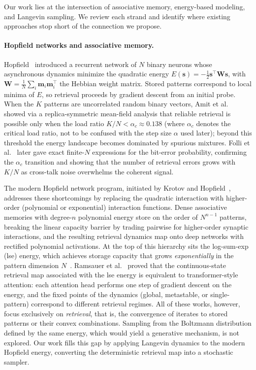 
Our work lies at the intersection of associative memory, energy-based modeling, and Langevin sampling. We review each strand and identify where existing approaches stop short of the connection we propose.

\paragraph{Hopfield networks and associative memory.}
Hopfield~\cite{hopfieldNeuralNetworksPhysical1982} introduced a recurrent network of $N$ binary neurons whose asynchronous dynamics minimize the quadratic energy $E(\mathbf{s})=-\frac{1}{2}\mathbf{s}^{\top}\mathbf{W}\mathbf{s}$, with $\mathbf{W}=\frac{1}{N}\sum_{i}\mathbf{m}_i\mathbf{m}_i^{\top}$ the Hebbian weight matrix. Stored patterns correspond to local minima of $E$, so retrieval proceeds by gradient descent from an initial probe. When the $K$ patterns are uncorrelated random binary vectors, Amit et al.~\cite{amitStoringInfiniteNumbers1985} showed via a replica-symmetric mean-field analysis that reliable retrieval is possible only when the load ratio $K/N < \alpha_c \approx 0.138$ (where $\alpha_c$ denotes the critical load ratio, not to be confused with the step size $\alpha$ used later); beyond this threshold the energy landscape becomes dominated by spurious mixtures. Folli et al.~\cite{folliMaximumStorageCapacity2017} later gave exact finite-$N$ expressions for the bit-error probability, confirming the $\alpha_c$ transition and showing that the number of retrieval errors grows with $K/N$ as cross-talk noise overwhelms the coherent signal.

The modern Hopfield network program, initiated by Krotov and Hopfield~\cite{krotovDenseAssociativeMemory2016}, addresses these shortcomings by replacing the quadratic interaction with higher-order (polynomial or exponential) interaction functions. Dense associative memories with degree-$n$ polynomial energy store on the order of $N^{n-1}$ patterns, breaking the linear capacity barrier by trading pairwise for higher-order synaptic interactions, and the resulting retrieval dynamics map onto deep networks with rectified polynomial activations. At the top of this hierarchy sits the log-sum-exp (lse) energy, which achieves storage capacity that grows \emph{exponentially} in the pattern dimension $N$~\cite{ramsauerHopfieldNetworksAll2021}. Ramsauer et al.~\cite{ramsauerHopfieldNetworksAll2021} proved that the continuous-state retrieval map associated with the lse energy is equivalent to transformer-style attention: each attention head performs one step of gradient descent on the energy, and the fixed points of the dynamics (global, metastable, or single-pattern) correspond to different retrieval regimes. All of these works, however, focus exclusively on \emph{retrieval}, that is, the convergence of iterates to stored patterns or their convex combinations. Sampling from the Boltzmann distribution defined by the same energy, which would yield a generative mechanism, is not explored. Our work fills this gap by applying Langevin dynamics to the modern Hopfield energy, converting the deterministic retrieval map into a stochastic sampler.

